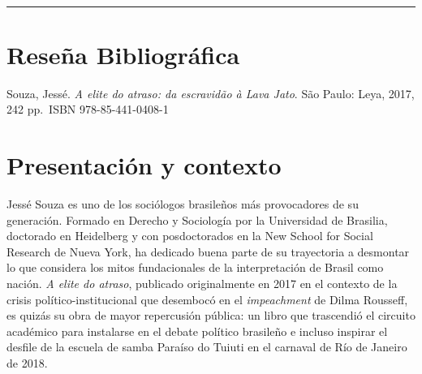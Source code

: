 \begin{textblock*}{68mm}
{\begin{minipage}[t]{68mm}
{\href{https://www.facebook.com/sharer/sharer.php?u=https%3A%2F%2Fwww.google.com%2F}{}~
\href{https://www.linkedin.com/sharing/share-offsite/?url=https%3A%2F%2Fwww.google.com%2F}{}~
\href{https://www.reddit.com/submit?url=https%3A%2F%2Fwww.google.com%2F&title=Rese%C3%B1a%20bibliogr%C3%A1fica}{}~
\href{https://www.researchgate.net/search?q=Rese%C3%B1a%20bibliogr%C3%A1fica}{}~
\href{https://t.me/share/url?url=https%3A%2F%2Fwww.google.com%2F&text=Rese%C3%B1a%20bibliogr%C3%A1fica}{}~
\href{https://wa.me/?text=https%3A%2F%2Fwww.google.com%2F}{}~
\href{https://twitter.com/intent/tweet?url=https%3A%2F%2Fwww.google.com%2F&text=Rese%C3%B1a%20bibliogr%C3%A1fica}{}
}\par
\end{minipage}%
}%
\end{textblock*}


\bigskip
\noindent\rule{\linewidth}{0.4pt}
\bigskip

\section{Reseña Bibliográfica}
Souza, Jessé. \textit{A elite do atraso: da escravidão à Lava Jato}. São Paulo: Leya, 2017, 242 pp. ISBN 978-85-441-0408-1


\section{Presentación y contexto}
Jessé Souza es uno de los sociólogos brasileños más provocadores de su generación. Formado en Derecho y Sociología por la Universidad de Brasilia, doctorado en Heidelberg y con posdoctorados en la New School for Social Research de Nueva York, ha dedicado buena parte de su trayectoria a desmontar lo que considera los mitos fundacionales de la interpretación de Brasil como nación. \textit{A elite do atraso}, publicado originalmente en 2017 en el contexto de la crisis político-institucional que desembocó en el \textit{impeachment} de Dilma Rousseff, es quizás su obra de mayor repercusión pública: un libro que trascendió el circuito académico para instalarse en el debate político brasileño e incluso inspirar el desfile de la escuela de samba Paraíso do Tuiuti en el carnaval de Río de Janeiro de 2018.

